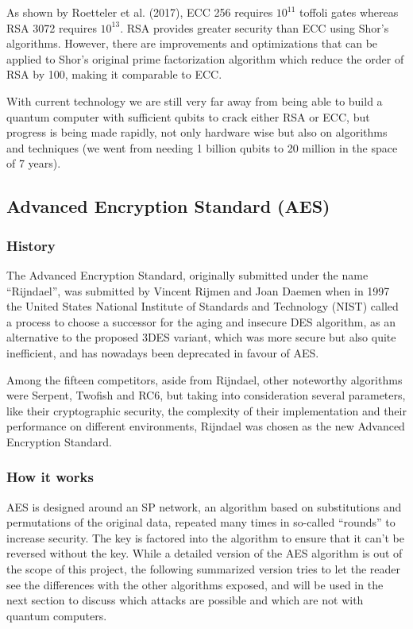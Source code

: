 As shown by Roetteler et al. (2017), ECC 256 requires $10^{11}$  toffoli gates
whereas RSA 3072 requires $10^{13}$. RSA provides greater security than ECC
using Shor's algorithms. However, there are improvements and optimizations that
can be applied to Shor's original prime factorization algorithm which reduce the
order of RSA by 100, making it comparable to ECC.

With current technology we are still very far away from being able to build a
quantum computer with sufficient qubits to crack either RSA or ECC, but progress
is being made rapidly, not only hardware wise but also on algorithms and
techniques (we went from needing 1 billion qubits to 20 million in the space of 7 years).
\cite{baumhof_are_2019}

\pagebreak

\subsection{Advanced Encryption Standard (AES)}

\subsubsection{History}

The Advanced Encryption Standard, originally submitted under the name
“Rijndael”, was submitted by Vincent Rijmen and Joan Daemen when in  1997 the
United States National Institute of Standards and Technology (NIST) called a
process to choose a successor for the aging and insecure DES algorithm, as an
alternative to the proposed 3DES variant, which was more secure but also quite
inefficient, and has nowadays been deprecated in favour of AES.

Among the fifteen competitors, aside from Rijndael, other noteworthy algorithms
were Serpent, Twofish and RC6, but taking into consideration several parameters,
like their cryptographic security, the complexity of their implementation and
their performance on different environments, Rijndael was chosen as the new
Advanced Encryption Standard.

\subsubsection{How it works}

AES is designed around an SP network, an algorithm based on substitutions and
permutations of the original data, repeated many times in so-called “rounds” to
increase security. The key is factored into the algorithm to ensure that it
can't be reversed without the key. While a detailed version of the AES algorithm
is out of the scope of this project, the following summarized version tries to
let the reader see the differences with the other algorithms exposed, and will
be used in the next section to discuss which attacks are possible and which are
not with quantum computers.

